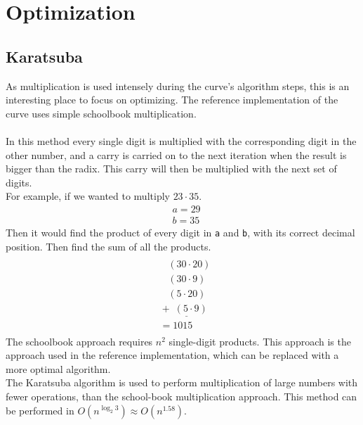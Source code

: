 \section{Optimization}

\subsection{Karatsuba}
As multiplication is used intensely during the curve's algorithm steps, this is an interesting place to focus on optimizing. The reference implementation of the curve uses simple schoolbook multiplication.\\
\\
In this method every single digit is multiplied with the corresponding digit in the other number, and a carry is carried on to the next iteration when the result is bigger than the radix. This carry will then be multiplied with the next set of digits.\\
For example, if we wanted to multiply $23 \cdot 35$.
\begin{equation*}
    \begin{split}
        & a = 29\\
        & b = 35
    \end{split}
\end{equation*}
Then it would find the product of every digit in \texttt{a} and \texttt{b}, with its correct decimal position. Then find the sum of all the products.
\begin{equation*}
    \begin{split}
        \\
       &\;\;\;\;(30 \cdot 20)\\
       &\;\;\;\;(30 \cdot 9)\\
       &\;\;\;\;(5 \cdot 20)\\
       &\underline{\;+ \; (5 \cdot 9)\;\;\;}\\
       &\; = 1015\\
    \end{split}
\end{equation*}
The schoolbook approach requires $n^{2}$ single-digit products. 
This approach is the approach used in the reference implementation, which can be replaced with a more optimal algorithm.\medskip
\\
\label{karat-opti}The Karatsuba algorithm is used to perform multiplication of large numbers with fewer operations, than the school-book multiplication approach. This method can be performed in $O(n^{\log_{2}3}) \approx O(n^{1.58})$.
